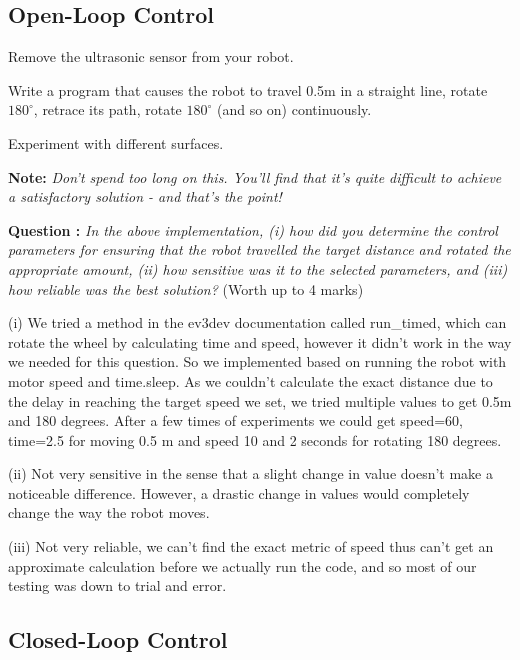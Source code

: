 \documentclass[hidelinks,a4paper,11pt]{article}
\newcounter{question}
\newcommand\myq{\refstepcounter{question}\thequestion}
\begin{document}
\subsection{Open-Loop Control}

\begin{todolist}
	\item Remove the ultrasonic sensor from your robot.
	\item Write a program that causes the robot to travel 0.5m in a straight line, rotate $180^{\circ}$, retrace its path, rotate $180^{\circ}$ (and so on) continuously.
	\item Experiment with different surfaces.
\end{todolist}

{\bfseries Note:}  \emph{Don't spend too long on this.  You'll find that it's quite difficult to achieve a satisfactory solution - and that's the point!}

{\bfseries Question \myq:}  \emph{In the above implementation, (i) how did you determine the control parameters for ensuring that the robot travelled the target distance and rotated the appropriate amount, (ii) how sensitive was it to the selected parameters, and (iii) how reliable was the best solution?} (Worth up to 4 marks)\\
\begin{mdframed}
(i) We tried a method in the ev3dev documentation called run\_timed, which can rotate the wheel by calculating time and speed, however it didn't work in the way we needed for this question.
 So we implemented based on running the robot with motor speed and time.sleep. As we couldn't calculate the exact distance due to the delay in reaching the target speed we set, we tried multiple values to get 0.5m and 180 degrees. 
After a few times of experiments we could get speed=60, time=2.5 for moving 0.5 m and speed 10 and 2 seconds for rotating 180 degrees.

(ii) Not very sensitive in the sense that a slight change in value doesn't make a noticeable difference. However, a drastic change in values would completely change the way the robot moves.  

(iii) Not very reliable, we can't find the exact metric of speed thus can't get an approximate calculation before we actually run the code, and so most of our testing was down to trial and error.
\end{mdframed}
\vspace*{\baselineskip}


\subsection{Closed-Loop Control}
\end{document}
